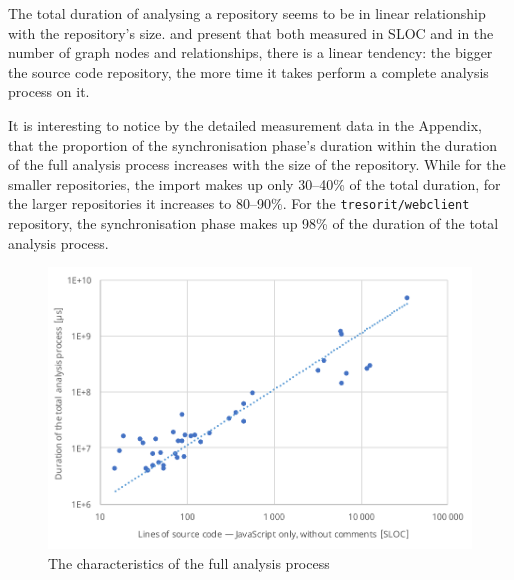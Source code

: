The total duration of analysing a repository seems to be in linear relationship with the repository's size.  and  present that both measured in SLOC and in the number of graph nodes and relationships, there is a linear tendency: the bigger the source code repository, the more time it takes perform a complete analysis process on it.

It is interesting to notice by the detailed measurement data in the Appendix, that the proportion of the synchronisation phase's duration within the duration of the full analysis process increases with the size of the repository. While for the smaller repositories, the import makes up only 30–40\% of the total duration, for the larger repositories it increases to 80–90\%. For the \lstinline{tresorit/webclient} repository, the synchronisation phase makes up 98\% of the duration of the total analysis process.

\begin{figure}[!p]
	\centerfloat
	\includegraphics[width=\textwidth-1cm,clip]{figures/measurement-totaltime-sloc.pdf}
	\caption{The characteristics of the full analysis process}
	\label{fig:measurement-totaltime-sloc}
\end{figure}

